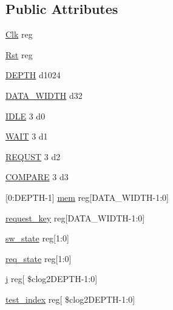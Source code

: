 \subsection*{Public Attributes}
\begin{DoxyCompactItemize}
\item 
\mbox{\hyperlink{enumbinary__search__tb_a148adc223b3ec1ebf1a9d3014bba5c57}{Clk}} reg
\item 
\mbox{\hyperlink{enumbinary__search__tb_ad64af76bd3572600605115944fe0ddeb}{Rst}} reg
\item 
\mbox{\hyperlink{enumbinary__search__tb_a966aad5e0c678340650456fee3ae4392}{D\+E\+P\+TH}} \textquotesingle{}d1024
\item 
\mbox{\hyperlink{enumbinary__search__tb_a4320519c9374f2c2755d18e3f83abe38}{D\+A\+T\+A\+\_\+\+W\+I\+D\+TH}} \textquotesingle{}d32
\item 
\mbox{\hyperlink{enumbinary__search__tb_a756353f91e17615905867350b7df2178}{I\+D\+LE}} 3 \textquotesingle{}d0
\item 
\mbox{\hyperlink{enumbinary__search__tb_ab04344ebfa7778e003bff3b5b90b98b5}{W\+A\+IT}} 3 \textquotesingle{}d1
\item 
\mbox{\hyperlink{enumbinary__search__tb_a48be18b536c71939fee1bc175ddfe82f}{R\+E\+Q\+U\+ST}} 3 \textquotesingle{}d2
\item 
\mbox{\hyperlink{enumbinary__search__tb_a3bdf46b2b8703a5293bb1322d4802039}{C\+O\+M\+P\+A\+RE}} 3 \textquotesingle{}d3
\item 
\mbox{[}0\+:D\+E\+P\+TH-\/1\mbox{]} \mbox{\hyperlink{enumbinary__search__tb_a1f84d0ccad171ddd61f482601523e35b}{mem}} reg\mbox{[}D\+A\+T\+A\+\_\+\+W\+I\+D\+TH-\/1\+:0\mbox{]}
\item 
\mbox{\hyperlink{enumbinary__search__tb_a55f9f2f8be34929a07a9cbd51b0077ef}{request\+\_\+key}} reg\mbox{[}D\+A\+T\+A\+\_\+\+W\+I\+D\+TH-\/1\+:0\mbox{]}
\item 
\mbox{\hyperlink{enumbinary__search__tb_a915112263d36b38ff53acdf2a4f1c7e7}{sw\+\_\+state}} reg\mbox{[}1\+:0\mbox{]}
\item 
\mbox{\hyperlink{enumbinary__search__tb_a5dea527f6196d0f38b066d000f02ed02}{req\+\_\+state}} reg\mbox{[}1\+:0\mbox{]}
\item 
\mbox{\hyperlink{enumbinary__search__tb_a108c2786d7b262af34cfd3b13d923d82}{j}} reg\mbox{[} \$clog2\+D\+E\+P\+TH-\/1\+:0\mbox{]}
\item 
\mbox{\hyperlink{enumbinary__search__tb_a7d2f566ab297925c822fd0dceb40a4a6}{test\+\_\+index}} reg\mbox{[} \$clog2\+D\+E\+P\+TH-\/1\+:0\mbox{]}

\end{DoxyCompactItemize}
